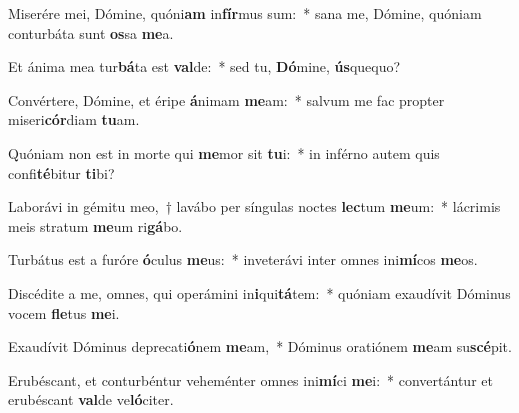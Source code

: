 \item Miserére mei, Dómine, quóni\textbf{am} in\textbf{fír}mus sum:~* sana me, Dómine, quóniam conturbáta sunt \textbf{os}sa \textbf{me}a.
\item Et ánima mea tur\textbf{bá}ta est \textbf{val}de:~* sed tu, \textbf{Dó}mine, \textbf{ús}quequo?
\item Convértere, Dómine, et éripe \textbf{á}nimam \textbf{me}am:~* salvum me fac propter miseri\textbf{cór}diam \textbf{tu}am.
\item Quóniam non est in morte qui \textbf{me}mor sit \textbf{tu}i:~* in inférno autem quis confi\textbf{té}bitur \textbf{ti}bi?
\item Laborávi in gémitu meo,~† lavábo per síngulas noctes \textbf{lec}tum \textbf{me}um:~* lácrimis meis stratum \textbf{me}um ri\textbf{gá}bo.
\item Turbátus est a furóre \textbf{ó}culus \textbf{me}us:~* inveterávi inter omnes ini\textbf{mí}cos \textbf{me}os.
\item Discédite a me, omnes, qui operámini in\textbf{i}qui\textbf{tá}tem:~* quóniam exaudívit Dóminus vocem \textbf{fle}tus \textbf{me}i.
\item Exaudívit Dóminus deprecati\textbf{ó}nem \textbf{me}am,~* Dóminus oratiónem \textbf{me}am su\textbf{scé}pit.
\item Erubéscant, et conturbéntur veheménter omnes ini\textbf{mí}ci \textbf{me}i:~* convertántur et erubéscant \textbf{val}de ve\textbf{ló}citer.
